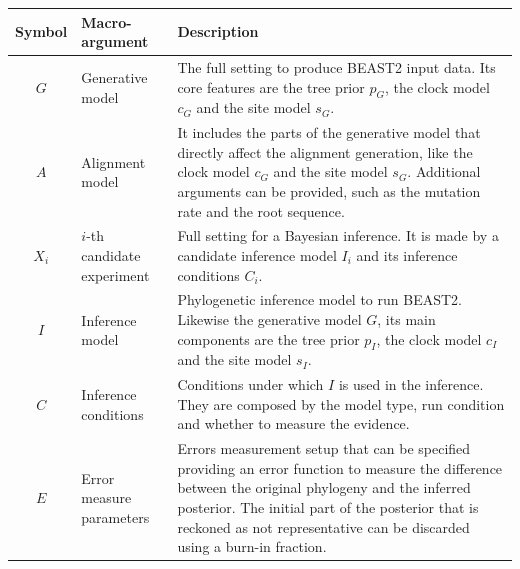 \begin{table}
  \begin{tabular}{|@{}c|p{4cm}|p{12.2cm}|}
    \hline
    \centering
    \textbf{Symbol} &
    \textbf{Macro-argument} &
    \textbf{Description} \\
    \hline
    $\mathit{G}$ &
    Generative model &
    The full setting to produce BEAST2 input data. 
    Its core features are the tree prior $\mathit{p_{G}}$, the clock 
    model $\mathit{c_{G}}$ and the site model $\mathit{s_{G}}$. \\
    $\mathit{A}$ &
    Alignment model &
    It includes the parts of the generative model that directly affect the 
    alignment generation, like the clock model $\mathit{c_{G}}$ and 
    the site model $\mathit{s_{G}}$. Additional arguments can be provided, 
    such as the mutation rate and the root sequence. \\
    $\mathit{X_{i}}$ &
    $i$-th candidate experiment &
    Full setting for a Bayesian inference. It is made by a 
    candidate inference model $\mathit{I_{i}}$ and its 
    inference conditions $\mathit{C_{i}}$. \\
    $\mathit{I}$ &
    Inference model &
    Phylogenetic inference model to run BEAST2. Likewise the generative model $G$, 
    its main components are the tree prior $\mathit{p_{I}}$, the clock model $\mathit{c_{I}}$ and the site model $\mathit{s_{I}}$. \\
    $\mathit{C}$ & Inference conditions & Conditions under which $\mathit{I}$ 
    is used in the inference. 
    They are composed by the model type, run condition and 
    whether to measure the evidence. \\
    $\mathit{E}$ & Error measure parameters & 
    Errors measurement setup that can be specified providing an 
    error function to measure the difference between the original phylogeny 
    and the inferred posterior. The initial part of the posterior that is 
    reckoned as not representative can be discarded using a burn-in fraction. \\

\end{tabular}
\end{table}
